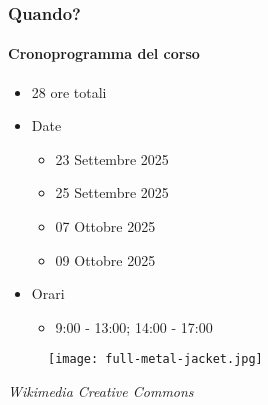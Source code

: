 \begin{frame}[t,fragile] \frametitle{Quando?}
\framesubtitle{Cronoprogramma del corso}
    \begin{itemize}[leftmargin=10pt,align=right]
        \item[\alert{\faHandORight}] 28 ore totali
        \item[\alert{\faHandORight}] Date
        \begin{itemize}[leftmargin=10pt,align=right]
            \item[\alert{\faHandORight}] 23 Settembre 2025
            \item[\alert{\faHandORight}] 25 Settembre 2025
            \item[\alert{\faHandORight}] 07 Ottobre 2025
            \item[\alert{\faHandORight}] 09 Ottobre 2025
        \end{itemize}
        \item[\alert{\faHandORight}] Orari
        \begin{itemize}[leftmargin=10pt,align=right]
            \item[\alert{\faHandORight}] 9:00 - 13:00; 14:00 - 17:00
        \end{itemize}
    \end{itemize}
    \begin{center}
        \begin{minipage}[b]{.45\textwidth}
		    \begin{figure}[ht]
			    \texttt{[image: full-metal-jacket.jpg]}
		    \end{figure}
            \begin{flushright}
                \vspace*{-10pt}
                {\tiny\textit{\textcopyright Wikimedia Creative Commons}}
            \end{flushright}
	    \end{minipage}
    \end{center}
\end{frame}

